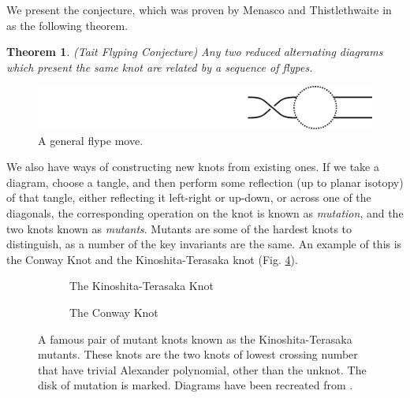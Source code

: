 \documentclass[12pt]{report}
\newtheorem*{theorem}{Theorem}
\begin{document}
We present the conjecture, which was proven by Menasco and Thistlethwaite in \cite{classification-alternating-links} as the following theorem.
\begin{theorem}(Tait Flyping Conjecture)
	Any two reduced alternating diagrams which present the same knot are related by a sequence of flypes.
\end{theorem}

\begin{figure}[hbt]
	\centering
	\includegraphics[width=0.7\linewidth]{graphics/flype}
	\caption{A general flype move.}
	\label{fig:flype}
\end{figure}

We also have ways of constructing new knots from existing ones. If we take a diagram, choose a tangle, and then perform some reflection (up to planar isotopy) of that tangle, either reflecting it left-right or up-down, or across one of the diagonals, the corresponding operation on the knot is known as \textit{mutation}, and the two knots known as \textit{mutants}. Mutants are some of the hardest knots to distinguish, as a number of the key invariants are the same. An example of this is the Conway Knot and the Kinoshita-Terasaka knot (Fig. \ref{fig:kinoshita-terasaka-mutants}).

\begin{figure}[hbt]
	\centering
	\hfill
	\begin{subfigure}[b]{0.4 \textwidth}
		\centering
		\def\svgscale{0.25}
		
		\caption{The Kinoshita-Terasaka Knot}
		\label{fig:kinoshita-terasaka-knot}
	\end{subfigure}
	\hfill
	\begin{subfigure}[b]{0.4 \textwidth}
		\centering
		\def\svgscale{0.25}
		
		\caption{The Conway Knot}
		\label{fig:conway-knot}
	\end{subfigure}
	\hfill \phantom{1}
	\caption{A famous pair of mutant knots known as the Kinoshita-Terasaka mutants. These knots are the two knots of lowest crossing number that have trivial Alexander polynomial, other than the unknot. The disk of mutation is marked. Diagrams have been recreated from \cite{the-knot-book}.}
	\label{fig:kinoshita-terasaka-mutants}
\end{figure}
\end{document}
